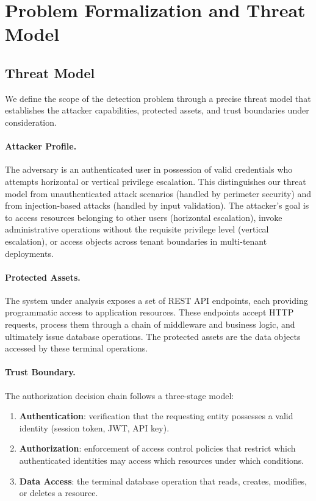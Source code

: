 \section{Problem Formalization and Threat Model}
\label{sec:threat-model}

\subsection{Threat Model}

We define the scope of the detection problem through a precise threat model that establishes the attacker capabilities, protected assets, and trust boundaries under consideration.

\paragraph{Attacker Profile.} The adversary is an authenticated user in possession of valid credentials who attempts horizontal or vertical privilege escalation. This distinguishes our threat model from unauthenticated attack scenarios (handled by perimeter security) and from injection-based attacks (handled by input validation). The attacker's goal is to access resources belonging to other users (horizontal escalation), invoke administrative operations without the requisite privilege level (vertical escalation), or access objects across tenant boundaries in multi-tenant deployments.

\paragraph{Protected Assets.} The system under analysis exposes a set of REST API endpoints, each providing programmatic access to application resources. These endpoints accept HTTP requests, process them through a chain of middleware and business logic, and ultimately issue database operations. The protected assets are the data objects accessed by these terminal operations.

\paragraph{Trust Boundary.} The authorization decision chain follows a three-stage model:
\begin{enumerate}
    \item \textbf{Authentication}: verification that the requesting entity possesses a valid identity (session token, JWT, API key).
    \item \textbf{Authorization}: enforcement of access control policies that restrict which authenticated identities may access which resources under which conditions.
    \item \textbf{Data Access}: the terminal database operation that reads, creates, modifies, or deletes a resource.
\end{enumerate}

